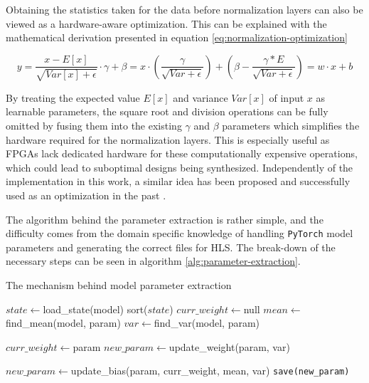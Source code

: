 Obtaining the statistics taken for the data before normalization layers can also be viewed as a hardware-aware optimization. This can be explained with the mathematical derivation presented in equation \ref{eq:normalization-optimization}

\begin{equation}\label{eq:normalization-optimization}
  y = \frac{x - E[x]}{\sqrt{Var[x] + \epsilon}} \cdot \gamma + \beta = x \cdot (\frac{\gamma}{\sqrt{Var + \epsilon}}) + (\beta - \frac{\gamma * E}{\sqrt{Var + \epsilon}}) = w \cdot x + b
\end{equation}

By treating the expected value \(E[x]\) and variance \(Var[x]\) of input \(x\) as learnable parameters, the square root and division operations can be fully omitted by fusing them into the existing \(\gamma\) and \(\beta\) parameters which simplifies the hardware required for the normalization layers. This is especially useful as FPGAs lack dedicated hardware for these computationally expensive operations, which could lead to suboptimal designs being synthesized. Independently of the implementation in this work, a similar idea has been proposed and successfully used as an optimization in the past \cite{46-fan2018real-time}.

The algorithm behind the parameter extraction is rather simple, and the difficulty comes from the domain specific knowledge of handling \texttt{PyTorch} model parameters and generating the correct files for HLS. The break-down of the necessary steps can be seen in algorithm \ref{alg:parameter-extraction}.

\begin{algorithm}
  \caption{The mechanism behind model parameter extraction}\label{alg:parameter-extraction}
  \begin{algorithmic}[1]
    \State $state \gets $load\_state(model)
    \State sort($state$)
    \State $curr\_weight \gets $null
      \State $mean \gets $find\_mean(model, param)
      \State $var \gets $find\_var(model, param)

        \State $curr\_weight \gets $param
        \State $new\_param \gets $update\_weight(param, var)

      \Else
        
        \State $new\_param \gets $update\_bias(param, curr\_weight, mean, var)
      \EndIf
      \State \texttt{save(new\_param)}
    \EndFor
  \end{algorithmic}
\end{algorithm}



